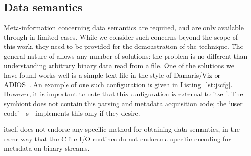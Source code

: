 
\subsection{Data semantics}

Meta-information concerning data semantics are required, and are
only available through \freeprocessing{} in limited cases.  While we
consider such concerns beyond the scope of this work, they need to be
provided for the demonstration of the technique.  The general nature of
\freeprocessing{} allows any number of solutions: the problem is no
different than understanding arbitrary binary data read from a file.
One of the solutions we have found works well is a simple text file
in the style of Damaris/Viz or ADIOS~\cite{Dorier:2013:Damaris,
Lofstead:2008:ADIOS}.  An example of one such configuration
is given in Listing~\ref{lst:jscfg}.  However, it is important to
note that this configuration is external to \freeprocessing{}
itself.  The symbiont does not contain this parsing and metadata
acquisition code; the `user
code'---\freeprocessor{}s---implements this only if they desire.


\begin{minipage}{\linewidth}

\vspace{-0.01em}
\end{minipage}

\freeprocessing{} itself does not endorse any specific method for
obtaining data semantics, in the same way that the C file I/O routines
do not endorse a specific encoding for metadata on binary streams.

